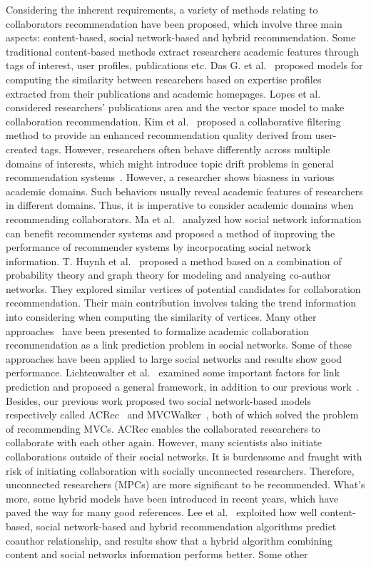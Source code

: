 \documentclass[10pt,letterpaper]{article}
\begin{document}
Considering the inherent requirements, a variety of methods relating to collaborators recommendation have been proposed, which involve three main aspects: content-based, social network-based and hybrid recommendation. Some traditional content-based methods extract researchers academic features through tags of interest, user profiles, publications etc. Das G. et al.~\cite{gollapalli2012similar} proposed models for computing the similarity between researchers based on expertise profiles extracted from their publications and academic homepages. Lopes et al.~\cite{lopes2010collaboration} considered researchers' publications area and the vector space model to make collaboration recommendation. Kim et al.~\cite{kim2010collaborative} proposed a collaborative filtering method to provide an enhanced recommendation quality derived from user-created tags. However, researchers often behave differently across multiple domains of interests, which might introduce topic drift problems in general recommendation systems~\cite{tang2012cross}. However, a researcher shows biasness in various academic domains. Such behaviors usually reveal academic features of researchers in different domains. Thus, it is imperative to consider academic domains when recommending collaborators. Ma et al.~\cite{ma2011recommender} analyzed how social network information can benefit recommender systems and proposed a method of improving the performance of recommender systems by incorporating social network information. T. Huynh et al.~\cite{huynh2013trend} proposed a method based on a combination of probability theory and graph theory for modeling and analysing co-author networks. They explored similar vertices of potential candidates for collaboration recommendation. Their main contribution involves taking the trend information into considering when computing the similarity of vertices. Many other approaches~\cite{chen2012discovering,sun2011co} have been presented to formalize academic collaboration recommendation as a link prediction problem in social networks. Some of these approaches have been applied to large social networks and results show good performance. Lichtenwalter et al.~\cite{lichtenwalter2010new} examined some important factors for link prediction and proposed a general framework, in addition to our previous work~\cite{li2014acrec,xia2014mvcwalker}. Besides, our previous work proposed two social network-based models respectively called ACRec~\cite{li2014acrec} and MVCWalker~\cite{xia2014mvcwalker}, both of which solved the problem of recommending MVCs. ACRec enables the collaborated researchers to collaborate with each other again. However, many scientists also initiate collaborations outside of their social networks. It is burdensome and fraught with risk of initiating collaboration with socially unconnected researchers. Therefore, unconnected researchers (MPCs) are more significant to be recommended. What's more, some hybrid models have been introduced in recent years, which have paved the way for many good references. Lee et al.~\cite{lee2011recommending} exploited how well content-based, social network-based and hybrid recommendation algorithms predict coauthor relationship, and results show that a hybrid algorithm combining content and social networks information performs better. Some other 
\end{document}
